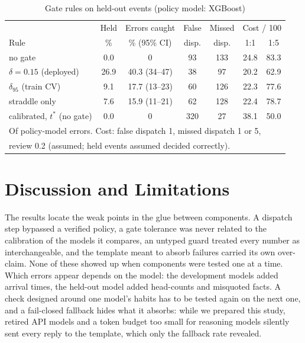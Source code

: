 \documentclass[conference]{IEEEtran}
\begin{document}
\begin{table}[t]
\caption{Gate rules on \CalTest{} held-out events (policy model: XGBoost)}
\label{tab:gate2}
\centering
\footnotesize
\setlength{\tabcolsep}{1.9pt}
\begin{tabular}{lcccccc}
\toprule
 & Held & Errors caught & False & Missed & \multicolumn{2}{c}{Cost / 100}\\
Rule & \% & \% (95\% CI) & disp. & disp. & 1:1 & 1:5\\
\midrule
no gate & 0.0 & 0 & 93 & 133 & 24.8 & 83.3\\
$\delta=0.15$ (deployed) & 26.9 & 40.3 (34--47) & 38 & 97 & 20.2 & 62.9\\
$\delta_{95}$ (train CV) & 9.1 & 17.7 (13--23) & 60 & 126 & 22.3 & 77.6\\
straddle only & 7.6 & 15.9 (11--21) & 62 & 128 & 22.4 & 78.7\\
calibrated, $t^{\ast}$ (no gate) & 0.0 & 0 & 320 & 27 & 38.1 & 50.0\\
\bottomrule
\multicolumn{7}{l}{\scriptsize Of \GtErrN{} policy-model errors. Cost: false dispatch 1, missed dispatch 1 or 5,}\\
\multicolumn{7}{l}{\scriptsize review 0.2 (assumed; held events assumed decided correctly).}\\
\end{tabular}
\end{table}

\section{Discussion and Limitations}
The results locate the weak points in the glue between components. A dispatch step bypassed a verified policy, a gate tolerance was never related to the calibration of the models it compares, an untyped guard treated every number as interchangeable, and the template meant to absorb failures carried its own over-claim. None of these showed up when components were tested one at a time. Which errors appear depends on the model: the development models added arrival times, the held-out model added head-counts and misquoted facts. A check designed around one model's habits has to be tested again on the next one, and a fail-closed fallback hides what it absorbs: while we prepared this study, retired API models and a token budget too small for reasoning models silently sent every reply to the template, which only the fallback rate revealed.
\end{document}
